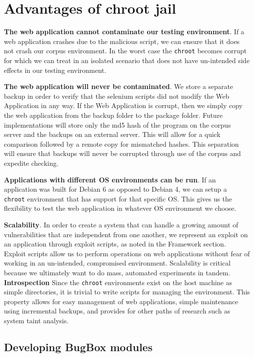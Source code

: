 \documentclass[letterpaper,twocolumn,10pt]{article}
\begin{document}
\section{Advantages of chroot jail}

{\bf The web application cannot contaminate our testing environment}.  If a web application crashes due to the malicious script, we can ensure that it does not crash our corpus environment.  In the worst case the {\tt chroot} becomes corrupt for which we can treat in an isolated scenario that does not have un-intended side effects in our testing environment.\par
{\bf The web application will never be contaminated}.  We store a separate backup in order to verify that the selenium scripts did not modify the Web Application in any way.  If the Web Application is corrupt, then we simply copy the web application from the backup folder to the package folder.  Future implementations will store only the md5 hash of the program on the corpus server and the backups on an external server.  This will allow for a quick comparison followed by a remote copy for mismatched hashes.  This separation will ensure that backups will never be corrupted through use of the corpus and expedite checking.\par
{\bf Applications with different OS environments can be run}.  If an application was built for Debian 6 as opposed to Debian 4, we can setup a {\tt chroot} environment that has support for that specific OS.  This gives us the flexibility to test the web application in whatever OS environment we choose.\par
{\bf Scalability}.  In order to create a system that can handle a growing amount of vulnerabilities that are independent from one another, we represent an exploit on an application through exploit scripts, as noted in the Framework section.  Exploit scripts allow us to perform operations on web applications without fear of working in an un-intended, compromised environment.  Scalability is critical because we ultimately want to do mass, automated experiments in tandem. 
{\bf Introspection} Since the {\tt chroot} environments exist on the host machine as simple directories, it is trivial to write scripts for managing the environment. This property allows for easy management of web applications, simple maintenance using incremental backups, and provides for other paths of research such as system taint analysis.

\subsection{Developing BugBox modules}
\end{document}
